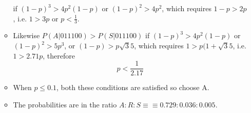 \documentclass[a4paper,12pt]{article}
\begin{document}
\begin{enumerate}[(a)]
\begin{itemize}


if $(1-p)^3 > 4p^2(1-p)$ or $(1-p)^2 >4p^2$, which requires $1-p>2p$, i.e. $1>3p$ or ${\displaystyle p<\frac{1}{3}}$.




\item Likewise $P(A|011100) > P(S|011100)$ if $(1-p)^3 > 4p^2(1-p)$ or $(1-p)^2 >5p^3$,  or ${\displaystyle (1-p) > p \sqrt{3}{5} }$, which requires $1 > p(1+\sqrt{3}{5}$, i.e. $1> 2.71p$, therefore
\[p < \frac{1}{2.17}\]

\item When $p \leq 0.1$, both these conditions are satisfied so choose A.
\item The probabilities are in the ratio $A:R:S \equiv≡ 0.729 : 0.036 : 0.005.$
\end{itemize}
\end{enumerate}
\end{document}
